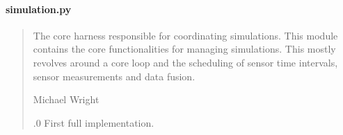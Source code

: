\documentclass[letterpaper,10pt,english]{sphinxmanual}
\begin{document}
\paragraph{simulation.py}
\label{\detokenize{modules/simulation/simulation:simulation-py}}\begin{quote}\begin{description}
\sphinxAtStartPar
The core harness responsible for coordinating simulations.
This module contains the core functionalities for managing simulations.
This mostly revolves around a core loop and the scheduling of sensor
time intervals, sensor measurements and data fusion.

\sphinxAtStartPar
Michael Wright \sphinxhyphen{} 

.0 \sphinxhyphen{} First full implementation.

\end{description}\end{quote}
\end{document}
